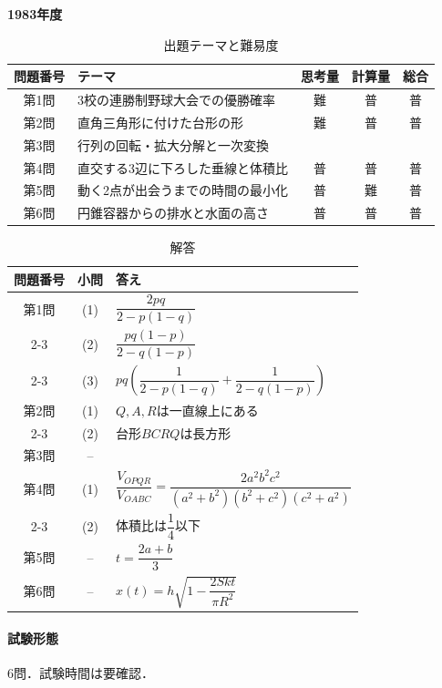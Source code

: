 \documentclass[../../main.tex]{subfiles}
\begin{document}
\begin{center}
  {\fontsize{48pt}{58pt}\selectfont \textbf{1983}\normalsize\textbf{年度}}
\end{center}

\begin{table}[htb]
  \centering
  \caption{出題テーマと難易度}
  \begin{tabular}{|c|p{6.2cm}|c|c|c|}
    \hline
    \textbf{問題番号} & \textbf{テーマ} & \textbf{思考量} & \textbf{計算量} & \textbf{総合} \\
    \hline
    第1問 & 3校の連勝制野球大会での優勝確率 & 難 & 普 & 普 \\
    \hline
    第2問 & 直角三角形に付けた台形の形 & 難 & 普 & 普 \\
    \hline
    第3問 & 行列の回転・拡大分解と一次変換 &  &  &  \\
    \hline
    第4問 & 直交する3辺に下ろした垂線と体積比 & 普 & 普 & 普 \\
    \hline
    第5問 & 動く2点が出会うまでの時間の最小化 & 普 & 難 & 普 \\
    \hline
    第6問 & 円錐容器からの排水と水面の高さ & 普 & 普 & 普 \\
    \hline
  \end{tabular}
\end{table}

\begin{table}[htb]
  \centering
  \caption{解答}
  \renewcommand{\arraystretch}{1.4}
  \begin{tabular}{|c|c|p{9cm}|}
    \hline
    \textbf{問題番号} & \textbf{小問} & \textbf{答え} \\
    \hline
    第1問 & (1) & $\dfrac{2pq}{2-p(1-q)}$ \\
    \cline{2-3}
    & (2) & $\dfrac{pq(1-p)}{2-q(1-p)}$ \\
    \cline{2-3}
    & (3) & $pq\left(\dfrac{1}{2-p(1-q)}+\dfrac{1}{2-q(1-p)}\right)$ \\
    \hline
    第2問 & (1) & $Q,A,R$は一直線上にある \\
    \cline{2-3}
    & (2) & 台形$BCRQ$は長方形 \\
    \hline
    第3問 & -- &  \\
    \hline
    第4問 & (1) & $\dfrac{V_{OPQR}}{V_{OABC}}=\dfrac{2a^2b^2c^2}{(a^2+b^2)(b^2+c^2)(c^2+a^2)}$ \\
    \cline{2-3}
    & (2) & 体積比は$\dfrac{1}{4}$以下 \\
    \hline
    第5問 & -- & $t=\dfrac{2a+b}{3}$ \\
    \hline
    第6問 & -- & $x(t)=h\sqrt{1-\dfrac{2Skt}{\pi R^2}}$ \\
    \hline
  \end{tabular}
\end{table}

\paragraph{試験形態}
6問．試験時間は要確認．
\end{document}
